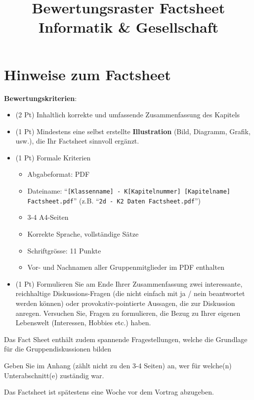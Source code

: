 

\title{Bewertungsraster Factsheet\\ \large Informatik \& Gesellschaft}

\maketitle

\section*{Hinweise zum Factsheet}

\textbf{Bewertungskriterien}:
\begin{itemize}
    \item (2 Pt) Inhaltlich korrekte und umfassende Zusammenfassung des Kapitels
    \item (1 Pt) Mindestens eine selbst erstellte \textbf{Illustration} (Bild, Diagramm, Grafik, usw.), die Ihr Factsheet sinnvoll ergänzt.
    \item (1 Pt) Formale Kriterien
    \begin{itemize}
        \item Abgabeformat: PDF
        \item Dateiname: \enquote{\texttt{[Klassenname] - K[Kapitelnummer] [Kapitelname] Factsheet.pdf}} (z.B. \enquote{\texttt{2d - K2 Daten Factsheet.pdf}})
        \item 3-4 A4-Seiten
        \item Korrekte Sprache, vollständige Sätze
        \item Schriftgrösse: 11 Punkte
        \item Vor- und Nachnamen aller Gruppenmitglieder im PDF enthalten
    \end{itemize}
    \item (1 Pt) Formulieren Sie am Ende Ihrer Zusammenfassung zwei interessante, reichhaltige Diskussions-Fragen (die nicht einfach mit ja / nein beantwortet werden können) oder provokativ-pointierte Aussagen, die zur Diskussion anregen. Versuchen Sie, Fragen zu formulieren, die Bezug zu Ihrer eigenen Lebenswelt (Interessen, Hobbies etc.) haben.
\end{itemize}


Das Fact Sheet enthält zudem spannende Fragestellungen, welche die Grundlage für die Gruppendiskussionen bilden

Geben Sie im Anhang (zählt nicht zu den 3-4 Seiten) an, wer für welche(n) Unterabschnitt(e) zuständig war.

\vspace{1em}

Das Factsheet ist spätestens eine Woche vor dem Vortrag abzugeben.


\newpage





